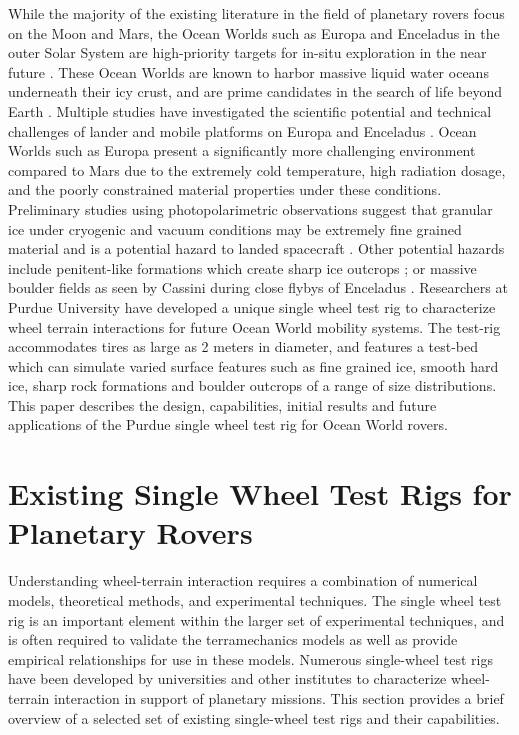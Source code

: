 \documentclass{article}
\begin{document}
While the majority of the existing literature in the field of planetary rovers focus on the Moon and Mars, the Ocean Worlds such as Europa and Enceladus in the outer Solar System are high-priority targets for in-situ exploration in the near future \cite{sherwood2018program}. These Ocean Worlds are known to harbor massive liquid water oceans underneath their icy crust, and are prime candidates in the search of life beyond Earth \cite{nimmo2016ocean}. Multiple studies have investigated the scientific potential and technical challenges of lander and mobile platforms on Europa and Enceladus \cite{pappalardo2013science,patthoff2018science,hand2017report,hobley2013rough,nayar2017surface}. Ocean Worlds such as Europa present a significantly more challenging environment compared to Mars due to the extremely cold temperature, high radiation dosage, and the poorly constrained material properties under these conditions. Preliminary studies using photopolarimetric observations suggest that granular ice under cryogenic and vacuum conditions may be extremely fine grained material and is a potential hazard to landed spacecraft \cite{nelson2018laboratory}. Other potential hazards include penitent-like formations which create sharp ice outcrops \cite{hobley2018formation}; or massive boulder fields as seen by Cassini during close flybys of Enceladus \cite{porco2006cassini}. Researchers at Purdue University have developed a unique single wheel test rig to characterize wheel terrain interactions for future Ocean World mobility systems. The test-rig accommodates tires as large as 2 meters in diameter, and features a test-bed which can simulate varied surface features such as fine grained ice, smooth hard ice, sharp rock formations and boulder outcrops of a range of size distributions. This paper describes the design, capabilities, initial results and future applications of the Purdue single wheel test rig for Ocean World rovers. 









\section{Existing Single Wheel Test Rigs for Planetary Rovers}
\label{sec:existing-test-rigs}

Understanding wheel-terrain interaction requires a combination of numerical models, theoretical methods, and experimental techniques. The single wheel test rig is an important element within the larger set of experimental techniques, and is often required to validate the terramechanics models as well as provide empirical relationships for use in these models. Numerous single-wheel test rigs have been developed by universities and other institutes to characterize wheel-terrain interaction in support of planetary missions. This section provides a brief overview of a selected set of existing single-wheel test rigs and their capabilities.
\end{document}
